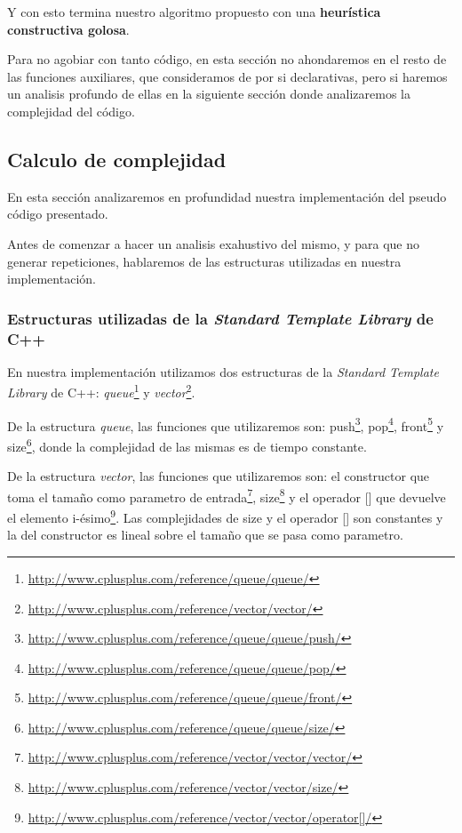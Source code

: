 Y con esto termina nuestro algoritmo propuesto con una \textbf{heurística constructiva golosa}.

Para no agobiar con tanto código, en esta sección no ahondaremos en el resto de las funciones auxiliares, que consideramos de por si declarativas, pero si haremos un analisis profundo de ellas en la siguiente sección donde analizaremos la complejidad del código.


\subsection{Calculo de complejidad}

En esta sección analizaremos en profundidad nuestra implementación del pseudo código presentado.

Antes de comenzar a hacer un analisis exahustivo del mismo, y para que no generar repeticiones, hablaremos de las estructuras utilizadas en nuestra implementación.

\subsubsection{Estructuras utilizadas de la \textit{Standard Template Library} de C++}

En nuestra implementación utilizamos dos estructuras de la \textit{Standard Template Library} de C++: \emph{queue}\footnote{\url{http://www.cplusplus.com/reference/queue/queue/}} y \emph{vector}\footnote{\url{http://www.cplusplus.com/reference/vector/vector/}}.

De la estructura \emph{queue}, las funciones que utilizaremos son: push\footnote{\url{http://www.cplusplus.com/reference/queue/queue/push/}}, pop\footnote{\url{http://www.cplusplus.com/reference/queue/queue/pop/}}, front\footnote{\url{http://www.cplusplus.com/reference/queue/queue/front/}} y size\footnote{\url{http://www.cplusplus.com/reference/queue/queue/size/}}, donde la complejidad de las mismas es de tiempo constante.

De la estructura \emph{vector}, las funciones que utilizaremos son: el constructor que toma el tamaño como parametro de entrada\footnote{\url{http://www.cplusplus.com/reference/vector/vector/vector/}}, size\footnote{\url{http://www.cplusplus.com/reference/vector/vector/size/}} y el operador [] que devuelve el elemento i-ésimo\footnote{\url{http://www.cplusplus.com/reference/vector/vector/operator[]/}}. Las complejidades de size y el operador [] son constantes y la del constructor es lineal sobre el tamaño que se pasa como parametro.


